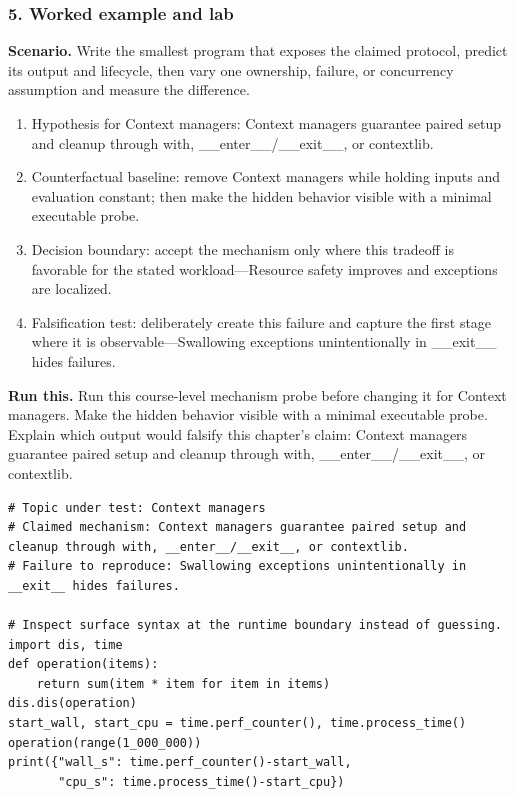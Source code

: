 \subsubsection*{5. Worked example and lab}
\textbf{Scenario.} Write the smallest program that exposes the claimed protocol, predict its output and lifecycle, then vary one ownership, failure, or concurrency assumption and measure the difference.
\begin{enumerate}
\item Hypothesis for Context managers: Context managers guarantee paired setup and cleanup through with, \_\_enter\_\_/\_\_exit\_\_, or contextlib.
\item Counterfactual baseline: remove Context managers while holding inputs and evaluation constant; then make the hidden behavior visible with a minimal executable probe.
\item Decision boundary: accept the mechanism only where this tradeoff is favorable for the stated workload—Resource safety improves and exceptions are localized.
\item Falsification test: deliberately create this failure and capture the first stage where it is observable—Swallowing exceptions unintentionally in \_\_exit\_\_ hides failures.
\end{enumerate}
\textbf{Run this.} Run this course-level mechanism probe before changing it for Context managers. Make the hidden behavior visible with a minimal executable probe. Explain which output would falsify this chapter's claim: Context managers guarantee paired setup and cleanup through with, \_\_enter\_\_/\_\_exit\_\_, or contextlib.
\begin{Verbatim}[fontsize=\scriptsize]
# Topic under test: Context managers
# Claimed mechanism: Context managers guarantee paired setup and cleanup through with, __enter__/__exit__, or contextlib.
# Failure to reproduce: Swallowing exceptions unintentionally in __exit__ hides failures.

# Inspect surface syntax at the runtime boundary instead of guessing.
import dis, time
def operation(items):
    return sum(item * item for item in items)
dis.dis(operation)
start_wall, start_cpu = time.perf_counter(), time.process_time()
operation(range(1_000_000))
print({"wall_s": time.perf_counter()-start_wall,
       "cpu_s": time.process_time()-start_cpu})
\end{Verbatim}
